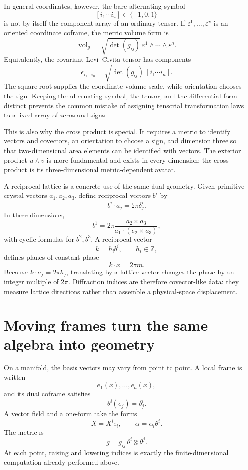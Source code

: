 In general coordinates, however, the bare alternating symbol
\[
  [i_1\cdots i_n]\in\{-1,0,1\}
\]
is not by itself the component array of an ordinary tensor.  If \(\varepsilon^1,\ldots,\varepsilon^n\) is an oriented coordinate coframe, the metric volume form is
\[
  \operatorname{vol}_g
  =\sqrt{\det(g_{ij})}\,
   \varepsilon^1\wedge\cdots\wedge\varepsilon^n.
\]
Equivalently, the covariant Levi--Civita tensor has components
\[
  \epsilon_{i_1\cdots i_n}
  =\sqrt{\det(g_{ij})}\,[i_1\cdots i_n].
\]
The square root supplies the coordinate-volume scale, while orientation chooses the sign.  Keeping the alternating symbol, the tensor, and the differential form distinct prevents the common mistake of assigning tensorial transformation laws to a fixed array of zeros and signs.

This is also why the cross product is special.  It requires a metric to identify vectors and covectors, an orientation to choose a sign, and dimension three so that two-dimensional area elements can be identified with vectors.  The exterior product \(u\wedge v\) is more fundamental and exists in every dimension; the cross product is its three-dimensional metric-dependent avatar.

A reciprocal lattice is a concrete use of the same dual geometry.  Given primitive crystal vectors \(a_1,a_2,a_3\), define reciprocal vectors \(b^i\) by
\[
  b^i\cdot a_j=2\pi\delta^i_j.
\]
In three dimensions,
\[
  b^1=2\pi\frac{a_2\times a_3}
  {a_1\cdot(a_2\times a_3)},
\]
with cyclic formulas for \(b^2,b^3\).  A reciprocal vector
\[
  k=h_i b^i,
  \qquad h_i\in\mathbb Z,
\]
defines planes of constant phase
\[
  k\cdot x=2\pi m.
\]
Because \(k\cdot a_j=2\pi h_j\), translating by a lattice vector changes the phase by an integer multiple of \(2\pi\).  Diffraction indices are therefore covector-like data: they measure lattice directions rather than assemble a physical-space displacement.

\section{Moving frames turn the same algebra into geometry}

On a manifold, the basis vectors may vary from point to point.  A local frame is written
\[
  e_1(x),\ldots,e_n(x),
\]
and its dual coframe satisfies
\[
  \theta^i(e_j)=\delta^i_j.
\]
A vector field and a one-form take the forms
\[
  X=X^ie_i,
  \qquad
  \alpha=\alpha_i\theta^i.
\]
The metric is
\[
  g=g_{ij}\,\theta^i\otimes\theta^j.
\]
At each point, raising and lowering indices is exactly the finite-dimensional computation already performed above.

